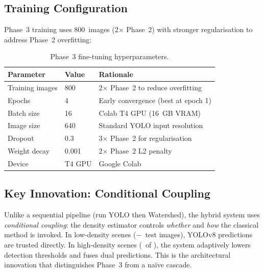 \documentclass[12pt, a4paper]{article}
\begin{document}
\subsection{Training Configuration}

Phase~3 training uses 800~images (2$\times$ Phase~2) with stronger
regularisation to address Phase~2 overfitting:

\begin{table}[H]
\centering
\caption{Phase~3 fine-tuning hyperparameters.}
\label{tab:hparams3}
\begin{tabular}{lll}
\toprule
\textbf{Parameter} & \textbf{Value} & \textbf{Rationale} \\
\midrule
Training images    & 800     & 2$\times$ Phase~2 to reduce overfitting \\
Epochs             & 4       & Early convergence (best at epoch 1)    \\
Batch size         & 16      & Colab T4 GPU (16~GB VRAM)              \\
Image size         & 640     & Standard YOLO input resolution         \\
Dropout            & 0.3     & 3$\times$ Phase~2 for regularisation   \\
Weight decay       & 0.001   & 2$\times$ Phase~2 L2 penalty            \\
Device             & T4 GPU  & Google Colab                            \\
\bottomrule
\end{tabular}
\end{table}

\subsection{Key Innovation: Conditional Coupling}

Unlike a sequential pipeline (run YOLO then Watershed), the hybrid system
uses \emph{conditional coupling}: the density estimator controls \emph{whether}
and \emph{how} the classical method is invoked.  In low-density scenes
(\nTest$-$\gateFired\ test images), YOLOv8 predictions are trusted directly.
In high-density scenes (\gateFired\ of \nTest), the system adaptively lowers
detection thresholds and fuses dual predictions.  This is the architectural
innovation that distinguishes Phase~3 from a na\"ive cascade.

\end{document}
